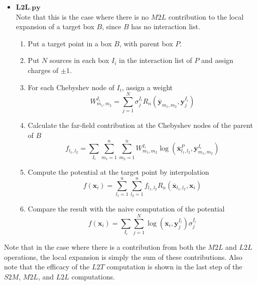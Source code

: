 \documentclass[11pt, oneside]{article}   	%
\begin{document}
\begin{appendices}
\begin{itemize}
\item $\mathbf{L2L.py}$\\
Note that this is the case where there is no $M2L$ contribution to the local expansion of a target box $B$, since $B$ has no interaction list. 
\begin{enumerate}
\item Put a target point in a box $B$, with parent box $P$.
\item Put $N$ sources in each box $I_i$ in the interaction list of $P$ and assign charges of $\pm 1$.
\item For each Chebyshev node of $I_i$, assign a weight
$$W^{I_i}_{m_1,m_2}=\sum_{j=1}^N \sigma^{I_i}_j R_n(\mathbf{\overline{y}}_{m_1,m_2},\mathbf{y}^{I_i}_j)$$
\item Calculate the far-field contribution at the Chebyshev nodes of the parent of $B$
$$f_{l_1,l_2}=\sum_{I_i}\sum_{m_1=1}^n\sum_{m_2=1}^n W^{I_i}_{m_1,m_2} \log(\mathbf{\overline{x}}^{P}_{l_1,l_2},\mathbf{\overline{y}}^{I_i}_{m_1,m_2})$$
\item Compute the potential at the target point by interpolation
$$f(\mathbf{x}_i)=\sum_{l_1=1}^n\sum_{l_2=1}^n f_{l_1,l_2} R_n(\mathbf{\overline{x}}_{l_1,l_2},\mathbf{x}_i)$$
\item Compare the result with the naive computation of the potential\\
$$f(\mathbf{x}_i)=\sum_{I_i}\sum_{j=1}^N \log(\mathbf{x}_i,\mathbf{y}^{I_i}_j) \sigma^{I_i}_j$$
\end{enumerate}
\end{itemize}
Note that in the case where there is a contribution from both the $M2L$ and $L2L$ operations, the local expansion is simply the sum of these contributions. Also note that the efficacy of the $L2T$ computation is shown in the last step of the $S2M$, $M2L$, and $L2L$ computations.
\end{appendices}
\end{document}
